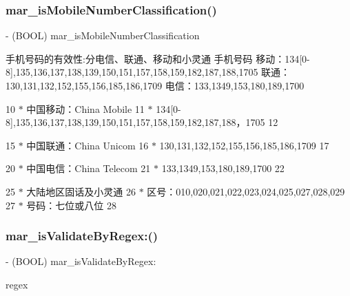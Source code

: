 \subsubsection{\texorpdfstring{mar\+\_\+is\+Mobile\+Number\+Classification()}{mar\_isMobileNumberClassification()}}
{\footnotesize\ttfamily -\/ (B\+O\+OL) mar\+\_\+is\+Mobile\+Number\+Classification \begin{DoxyParamCaption}{ }\end{DoxyParamCaption}}

手机号码的有效性\+:分电信、联通、移动和小灵通 手机号码 移动：134\mbox{[}0-\/8\mbox{]},135,136,137,138,139,150,151,157,158,159,182,187,188,1705 联通：130,131,132,152,155,156,185,186,1709 电信：133,1349,153,180,189,1700

10 $\ast$ 中国移动：\+China Mobile 11 $\ast$ 134\mbox{[}0-\/8\mbox{]},135,136,137,138,139,150,151,157,158,159,182,187,188，1705 12

15 $\ast$ 中国联通：\+China Unicom 16 $\ast$ 130,131,132,152,155,156,185,186,1709 17

20 $\ast$ 中国电信：\+China Telecom 21 $\ast$ 133,1349,153,180,189,1700 22

25 $\ast$ 大陆地区固话及小灵通 26 $\ast$ 区号：010,020,021,022,023,024,025,027,028,029 27 $\ast$ 号码：七位或八位 28 \mbox{\label{category_n_s_string_07_m_a_r_e_x___regex_08_ab0be1de32ee3675c594bd556451a6a61}} 
\subsubsection{\texorpdfstring{mar\+\_\+is\+Validate\+By\+Regex\+:()}{mar\_isValidateByRegex:()}}
{\footnotesize\ttfamily -\/ (B\+O\+OL) mar\+\_\+is\+Validate\+By\+Regex\+: \begin{DoxyParamCaption}\item[{(N\+S\+String $\ast$)}]{regex }\end{DoxyParamCaption}\hspace{0.3cm}{\ttfamily [implementation]}}

\mbox{\label{category_n_s_string_07_m_a_r_e_x___regex_08_a86cd0b09c3b885773e47ca3a31b8bafc}} 
